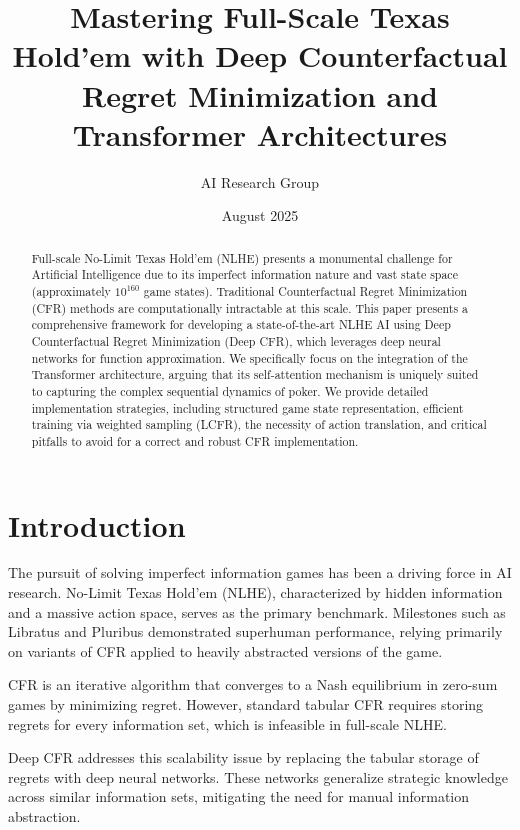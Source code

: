 \documentclass[11pt,a4paper]{article}
\title{Mastering Full-Scale Texas Hold'em with Deep Counterfactual Regret Minimization and Transformer Architectures}
\author[1]{AI Research Group}
\affil[1]{(Organization/Affiliation)}
\date{August 2025}
\begin{document}
\maketitle

\begin{abstract}
Full-scale No-Limit Texas Hold'em (NLHE) presents a monumental challenge for Artificial Intelligence due to its imperfect information nature and vast state space (approximately $10^{160}$ game states). Traditional Counterfactual Regret Minimization (CFR) methods are computationally intractable at this scale. This paper presents a comprehensive framework for developing a state-of-the-art NLHE AI using Deep Counterfactual Regret Minimization (Deep CFR), which leverages deep neural networks for function approximation. We specifically focus on the integration of the Transformer architecture, arguing that its self-attention mechanism is uniquely suited to capturing the complex sequential dynamics of poker. We provide detailed implementation strategies, including structured game state representation, efficient training via weighted sampling (LCFR), the necessity of action translation, and critical pitfalls to avoid for a correct and robust CFR implementation.
\end{abstract}

\section{Introduction}

The pursuit of solving imperfect information games has been a driving force in AI research. No-Limit Texas Hold'em (NLHE), characterized by hidden information and a massive action space, serves as the primary benchmark. Milestones such as Libratus \cite{brown2017superhuman} and Pluribus \cite{brown2019superhuman} demonstrated superhuman performance, relying primarily on variants of CFR applied to heavily abstracted versions of the game.

CFR \cite{zinkevich2007regret} is an iterative algorithm that converges to a Nash equilibrium in zero-sum games by minimizing regret. However, standard tabular CFR requires storing regrets for every information set, which is infeasible in full-scale NLHE.

Deep CFR \cite{brown2018deep} addresses this scalability issue by replacing the tabular storage of regrets with deep neural networks. These networks generalize strategic knowledge across similar information sets, mitigating the need for manual information abstraction.
\end{document}

